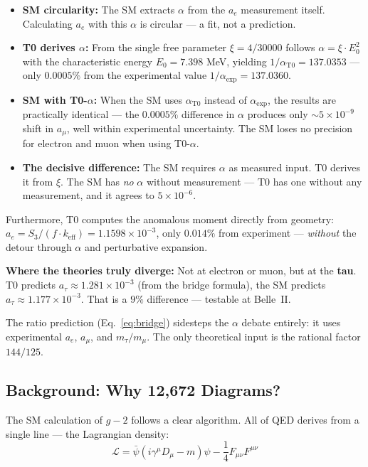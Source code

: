 \begin{itemize}
	\item \textbf{SM circularity:} The SM extracts $\alpha$ from the $a_e$ measurement itself. Calculating $a_e$ with this $\alpha$ is circular --- a fit, not a prediction.
	\item \textbf{T0 derives $\alpha$:} From the single free parameter $\xi = 4/30000$ follows $\alpha = \xi \cdot E_0^2$ with the characteristic energy $E_0 = 7.398$ MeV, yielding $1/\alpha_\text{T0} = 137.0353$ --- only $0.0005\%$ from the experimental value $1/\alpha_\text{exp} = 137.0360$.
	\item \textbf{SM with T0-$\alpha$:} When the SM uses $\alpha_\text{T0}$ instead of $\alpha_\text{exp}$, the results are practically identical --- the $0.0005\%$ difference in $\alpha$ produces only $\sim 5 \times 10^{-9}$ shift in $a_\mu$, well within experimental uncertainty. The SM loses no precision for electron and muon when using T0-$\alpha$.
	\item \textbf{The decisive difference:} The SM requires $\alpha$ as measured input. T0 derives it from $\xi$. The SM has \textit{no} $\alpha$ without measurement --- T0 has one without any measurement, and it agrees to $5 \times 10^{-6}$.
\end{itemize}

Furthermore, T0 computes the anomalous moment directly from geometry: $a_e = S_3/(f \cdot k_\text{eff}) = 1.1598 \times 10^{-3}$, only $0.014\%$ from experiment --- \textit{without} the detour through $\alpha$ and perturbative expansion.

\textbf{Where the theories truly diverge:} Not at electron or muon, but at the \textbf{tau}. T0 predicts $a_\tau \approx 1.281 \times 10^{-3}$ (from the bridge formula), the SM predicts $a_\tau \approx 1.177 \times 10^{-3}$. That is a $9\%$ difference --- testable at Belle~II.

The ratio prediction (Eq.~\ref{eq:bridge}) sidesteps the $\alpha$ debate entirely: it uses experimental $a_e$, $a_\mu$, and $m_\tau/m_\mu$. The only theoretical input is the rational factor $144/125$.

\subsection{Background: Why 12,672 Diagrams?}

The SM calculation of $g-2$ follows a clear algorithm. All of QED derives from a single line --- the Lagrangian density:
\begin{equation}
	\mathcal{L} = \bar{\psi}(i\gamma^\mu D_\mu - m)\psi - \frac{1}{4}F_{\mu\nu}F^{\mu\nu}
\end{equation}

